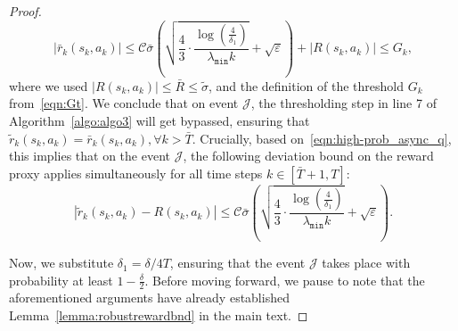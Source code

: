 \documentclass{article}
\newcommand{\mc}{\mathcal}
\begin{document}
\begin{proof}
\begin{equation}
\lvert \bar{r}_k(s_k, a_k) \rvert \leq \mc{C} \bar{\sigma} \left( 
            \sqrt{ \frac{4}{3} \cdot \frac{ \log\left( \frac{4}{\delta_1} \right) }{ \lambda_{\texttt{min}} k } } 
            + \sqrt{\varepsilon} 
        \right) + \lvert R(s_k, a_k) \rvert \leq G_k,
\end{equation}
where we used $\lvert R(s_k, a_k) \rvert \leq \bar{R} \leq \tilde{\sigma}$, and the definition of the threshold ${G}_k$ from~\eqref{eqn:Gt}. We conclude that on event $\mc{J}$, the thresholding step in line 7 of Algorithm~\ref{algo:algo3} will get bypassed, ensuring that $\tilde{r}_k(s_k,a_k) = \bar{r}_k(s_k, a_k), \forall k > \bar{T}.$ Crucially, based on~\eqref{eqn:high-prob_async_q}, this implies that on the event $\mc{J}$, the following deviation bound on the reward proxy applies
simultaneously for all time steps \(k \in [\bar{T}+1, T]\): 
\begin{equation}\label{eqn:good event X}
        \left| \tilde{r}_k(s_k, a_k) - R(s_k, a_k) \right| 
        \leq \mc{C} \bar{\sigma} \left( 
            \sqrt{ \frac{4}{3} \cdot \frac{ \log\left( \frac{4}{\delta_1} \right) }{ \lambda_{\texttt{min}} k } } 
            + \sqrt{\varepsilon} 
        \right). 
\end{equation}

Now, we substitute \( \delta_1 = \delta/4 T\), ensuring that the event $\mc{J}$ takes place with probability at least $1-\frac{\delta}{2}$. Before moving forward, we pause to note that the aforementioned arguments have already established Lemma~\ref{lemma:robustrewardbnd} in the main text. 


\end{proof}
\end{document}
